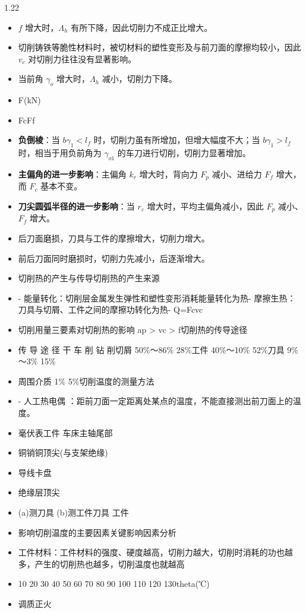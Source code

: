 \documentclass[12pt,a4paper]{article}
\begin{document}
\begin{spacing}{1.22}
\begin{itemize}[leftmargin=2.2em,label=--]
  \item $f$ 增大时，$\Lambda_h$ 有所下降，因此切削力不成正比增大。
  \item 切削铸铁等脆性材料时，被切材料的塑性变形及与前刀面的摩擦均较小，因此 $v_c$ 对切削力往往没有显著影响。
  \item 当前角 $\gamma_o$ 增大时，$\Lambda_h$ 减小，切削力下降。
  \item F(kN)
  \item FcFf
  \item \textbf{负倒棱}：当 $b\gamma_1<l_f$ 时，切削力虽有所增加，但增大幅度不大；当 $b\gamma_1>l_f$ 时，相当于用负前角为 $\gamma_{o1}$ 的车刀进行切削，切削力显著增加。
  \item \textbf{主偏角的进一步影响}：主偏角 $k_r$ 增大时，背向力 $F_p$ 减小、进给力 $F_f$ 增大，而 $F_c$ 基本不变。
  \item \textbf{刀尖圆弧半径的进一步影响}：当 $r_\varepsilon$ 增大时，平均主偏角减小，因此 $F_p$ 减小、$F_f$ 增大。
  \item 后刀面磨损，刀具与工件的摩擦增大，切削力增大。
  \item 前后刀面同时磨损时，切削力先减小，后逐渐增大。
  \item 切削热的产生与传导切削热的产生来源
  \item - 能量转化：切削层金属发生弹性和塑性变形消耗能量转化为热- 摩擦生热：刀具与切屑、工件之间的摩擦功转化为热- Q=Fcvc
  \item 切削用量三要素对切削热的影响 ap > vc > f切削热的传导途径
  \item 传 导 途 径 干 车 削 钻 削切屑 50\%～86\% 28\%工件 40\%～10\% 52\%刀具 9\%～3\% 15\%
  \item 周围介质 1\% 5\%切削温度的测量方法
  \item - 人工热电偶 ：距前刀面一定距离处某点的温度，不能直接测出前刀面上的温度。
  \item 毫伏表工件 车床主轴尾部
  \item 铜销铜顶尖(与支架绝缘)
  \item 导线卡盘
  \item 绝缘层顶尖
  \item (a)测刀具 (b)测工件刀具 工件
  \item 影响切削温度的主要因素关键影响因素分析
  \item 工件材料：工件材料的强度、硬度越高，切削力越大，切削时消耗的功也越多，产生的切削热也越多，切削温度也就越高
  \item 10 20 30 40 50 60 70 80 90 100 110 120 130theta(℃)
  \item 调质正火

\end{itemize}
\end{spacing}
\end{document}
